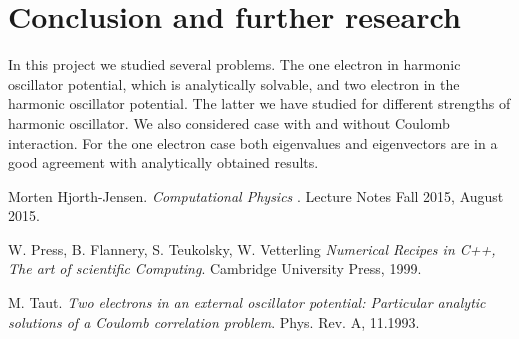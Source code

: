 \documentclass[10pt]{article}
\begin{document}
\newpage
\clearpage
\section{Conclusion and further research}
In this project we studied several problems. The one electron in harmonic oscillator potential, which is analytically solvable, and two electron in the harmonic oscillator potential. The latter we have studied for different strengths of harmonic oscillator. We also considered case with and without Coulomb interaction.
For the one electron case both eigenvalues and eigenvectors are in a good agreement with analytically obtained results.


\clearpage
\newpage
\begin{thebibliography}{2}
Morten Hjorth-Jensen. 
\textit{Computational Physics
}. 
Lecture Notes Fall 2015, August 2015.

W. Press, B. Flannery, S. Teukolsky, W. Vetterling 
\textit{Numerical Recipes in C++, The art of scientific Computing}. 
Cambridge University Press, 1999.

M. Taut. 
\textit{Two electrons in an external oscillator potential: Particular analytic solutions of a Coulomb correlation problem}.
Phys. Rev. A, 11.1993.
 
\end{thebibliography}
\end{document}
